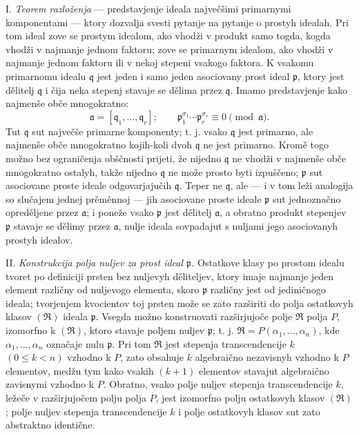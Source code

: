 \documentclass[11pt]{article}
\providecommand{\fraka}{\mathfrak a}
\providecommand{\frakp}{\mathfrak p}
\providecommand{\frakq}{\mathfrak q}
\providecommand{\frakR}{\mathfrak R}
\begin{document}
\noindent I. \emph{Teorem razloženja} --- predstavjenje ideala največšimi primarnymi komponentami --- ktory dozvalja svesti pytanje na pytanje o prostyh idealah. Pri tom ideal zove se prostym idealom, ako vhodži v produkt samo togda, kogda vhodži v najmanje jednom faktoru; zove se primarnym idealom, ako vhodži v najmanje jednom faktoru ili v nekoj stepeni vsakogo faktora. K vsakomu primarnomu idealu $\frakq$ jest jeden i samo jeden asociovany prost ideal $\frakp$, ktory jest dělitelj $\frakq$ i čija neka stepenj stavaje se dělima przez $\frakq$. Imamo predstavjenje kako najmenše obče mnogokratno:
\[
 \fraka=[\frakq_1,\ldots,\frakq_r];\qquad
 \frakp_1^{\sigma_1}\cdots \frakp_r^{\sigma_r}\equiv 0\pmod{\fraka}.
\]
Tut $\frakq$ sut največše primarne komponenty; t. j. vsako $\frakq$ jest primarno, ale najmenše obče mnogokratno kojih-koli dvoh $\frakq$ ne jest primarno. Kromě togo možno bez ograničenja obščnosti prijeti, že nijedno $\frakq$ ne vhodži v najmenše obče mnogokratno ostalyh, takže nijedno $\frakq$ ne može prosto byti izpuščeno; $\frakp$ sut asociovane proste ideale odgovarjajučih $\frakq$. Teper ne $\frakq$, ale --- i v tom leži analogija so slučajem jednej prěměnnoj --- jih asociovane proste ideale $\frakp$ sut jednoznačno opreděljene przez $\fraka$; i poneže vsako $\frakp$ jest dělitelj $\fraka$, a obratno produkt stepenjev $\frakp$ stavaje se dělimy przez $\fraka$, nulje ideala sovpadajut s nuljami jego asociovanyh prostyh idealov.

\noindent II. \emph{Konstrukcija polja nuljev za prost ideal $\frakp$.} Ostatkove klasy po prostom idealu tvoret po definiciji prsten bez nuljevyh děliteljev, ktory imaje najmanje jeden element različny od nuljevogo elementa, skoro $\frakp$ različny jest od jediničnogo ideala; tvorjenjem kvocientov toj prsten može se zato razširiti do polja ostatkovyh klasov $(\frakR)$ ideala $\frakp$. Vsegda možno konstruovati razširjujoče polje $\frakR$ polja $P$, izomorfno k $(\frakR)$, ktoro stavaje poljem nuljev $\frakp$; t. j. $\frakR=P(\alpha_1,\ldots,\alpha_n)$, kde $\alpha_1,\ldots,\alpha_n$ označaje nulu $\frakp$. Pri tom $\frakR$ jest stepenja transcendencije $k$ $(0\leq k<n)$ vzhodno k $P$, zato obsahuje $k$ algebraično nezavisnyh vzhodno k $P$ elementov, medžu tym kako vsakih $(k+1)$ elementov stavajut algebraično zavisnymi vzhodno k $P$. Obratno, vsako polje nuljev stepenja transcendencije $k$, ležeče v razširjujočem polju polja $P$, jest izomorfno polju ostatkovyh klasov $(\frakR)$; polje nuljev stepenja transcendencije $k$ i polje ostatkovyh klasov sut zato abstraktno identične.
\end{document}
